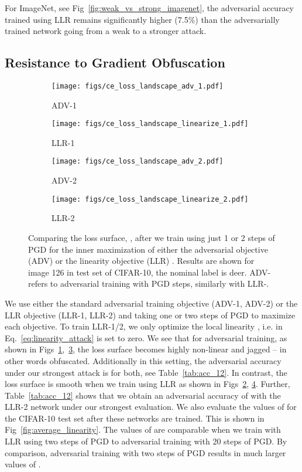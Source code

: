 \documentclass{article}
\theoremstyle{plain}
\theoremstyle{definition}
\theoremstyle{remark}
\begin{document}
For ImageNet, see Fig~\ref{fig:weak_vs_strong_imagenet}, the adversarial accuracy trained using LLR remains significantly higher (7.5\%) than the adversarially trained network going from a weak to a stronger attack. 
\subsection{Resistance to Gradient Obfuscation}\label{sec:resistance}
\begin{figure}[htb]
    \centering
    \begin{subfigure}{0.24\textwidth}
    \centering
    \texttt{[image: figs/ce\_loss\_landscape\_adv\_1.pdf]}
    \caption{ADV-1}\label{fig:adv1}
    \end{subfigure}
    \begin{subfigure}{0.24\textwidth}
    \texttt{[image: figs/ce\_loss\_landscape\_linearize\_1.pdf]}
    \caption{LLR-1}\label{fig:llr1}
    \end{subfigure}
    \begin{subfigure}{0.24\textwidth}
    \texttt{[image: figs/ce\_loss\_landscape\_adv\_2.pdf]}
    \caption{ADV-2}\label{fig:adv2}
    \end{subfigure}
    \begin{subfigure}{0.24\textwidth}
    \texttt{[image: figs/ce\_loss\_landscape\_linearize\_2.pdf]}
    \caption{LLR-2}\label{fig:llr2}
    \end{subfigure}
    \caption{\small{Comparing the loss surface, , after we train using just 1 or 2 steps of PGD for the inner maximization of either the adversarial objective (ADV)  or the linearity objective (LLR) . Results are shown for image 126 in test set of CIFAR-10, the nominal label is deer. ADV- refers to adversarial training with  PGD steps, similarly with LLR-.}}
    \label{fig:one_step}
\end{figure}
We use either the standard adversarial training objective (ADV-1, ADV-2) or the LLR objective (LLR-1, LLR-2) and taking one or two steps of PGD to maximize each objective. To train LLR-1/2, we only optimize the local linearity , i.e.  in Eq.~\eqref{eq:linearity_attack} is set to zero. We see that for adversarial training, as shown in Figs~\ref{fig:adv1},~\ref{fig:adv2}, the loss surface becomes highly non-linear and jagged -- in other words obfuscated. Additionally in this setting, the adversarial accuracy under our strongest attack is  for both, see Table~\ref{tab:acc_12}. In contrast, the loss surface is smooth when we train using LLR as shown in Figs~\ref{fig:llr1}, \ref{fig:llr2}. Further, Table~\ref{tab:acc_12} shows that we obtain an adversarial accuracy of  with the LLR-2 network under our strongest evaluation. We also evaluate the values of  for the CIFAR-10 test set after these networks are trained. This is shown in Fig~\ref{fig:average_linearity}. The values of  are comparable when we train with LLR using two steps of PGD to adversarial training with 20 steps of PGD. By comparison, adversarial training with two steps of PGD results in much larger values of .
 
\end{document}
